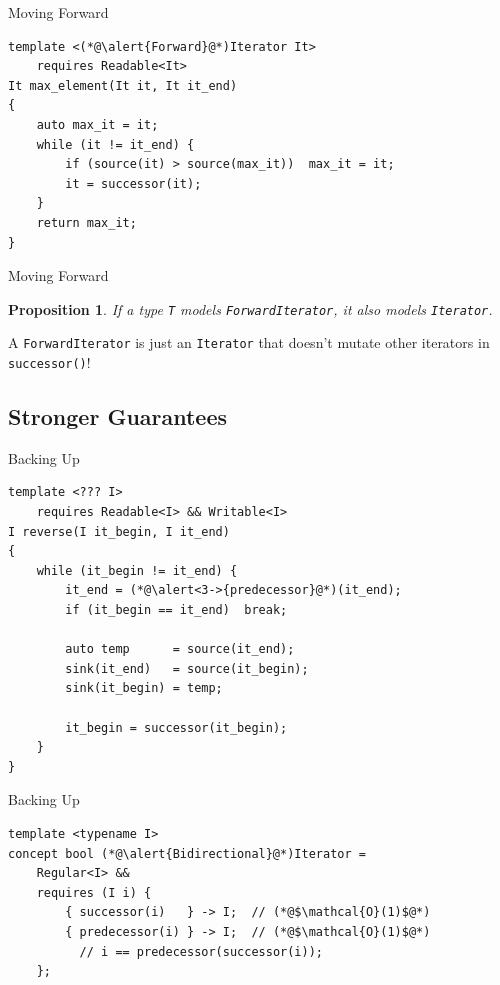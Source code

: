 \documentclass[aspectratio=169]{beamer}
\newtheorem{claim}{Proposition}
\begin{document}
\begin{frame}[fragile]{Moving Forward}
\begin{lstlisting}
template <(*@\alert{Forward}@*)Iterator It>
    requires Readable<It>
It max_element(It it, It it_end)
{
    auto max_it = it;
    while (it != it_end) {
        if (source(it) > source(max_it))  max_it = it;
        it = successor(it);
    }
    return max_it;
}
\end{lstlisting}
\end{frame}


\begin{frame}[fragile]{Moving Forward}
  \begin{claim}
    If a type \texttt{T} models \texttt{ForwardIterator}, it also
    models \texttt{Iterator}.
  \end{claim}
  \pause{}
  \begin{center}
    A \texttt{ForwardIterator} is just an \texttt{Iterator} that
    doesn't mutate other iterators in \texttt{successor()}!
  \end{center}
\end{frame}


\subsection{Stronger Guarantees}

\begin{frame}[fragile]{Backing Up}
  \pause{}
  \small
\begin{lstlisting}
template <??? I>
    requires Readable<I> && Writable<I>
I reverse(I it_begin, I it_end)
{
    while (it_begin != it_end) {
        it_end = (*@\alert<3->{predecessor}@*)(it_end);
        if (it_begin == it_end)  break;

        auto temp      = source(it_end);
        sink(it_end)   = source(it_begin);
        sink(it_begin) = temp;

        it_begin = successor(it_begin);
    }
}
\end{lstlisting}
\end{frame}


\begin{frame}[fragile]{Backing Up}
\begin{lstlisting}
template <typename I>
concept bool (*@\alert{Bidirectional}@*)Iterator =
    Regular<I> &&
    requires (I i) {
        { successor(i)   } -> I;  // (*@$\mathcal{O}(1)$@*)
        { predecessor(i) } -> I;  // (*@$\mathcal{O}(1)$@*)
          // i == predecessor(successor(i));
    };
\end{lstlisting}
\end{frame}
\end{document}
